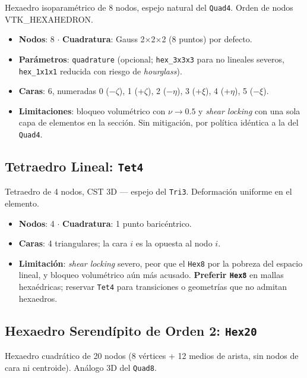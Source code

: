 \documentclass[11pt,oneside]{report}
\begin{document}
Hexaedro isoparamétrico de 8 nodos, espejo natural del \texttt{Quad4}. Orden de nodos VTK\_HEXAHEDRON.

\begin{itemize}
  \item \textbf{Nodos}: 8 \ensuremath{\cdot} \textbf{Cuadratura}: Gauss 2\ensuremath{\times}2\ensuremath{\times}2 (8 puntos) por defecto.
  \item \textbf{Parámetros}: \texttt{quadrature} (opcional; \texttt{hex\_3x3x3} para no lineales severos, \texttt{hex\_1x1x1} reducida con riesgo de \textit{hourglass}).
  \item \textbf{Caras}: 6, numeradas 0 (−\ensuremath{\zeta}), 1 (+\ensuremath{\zeta}), 2 (−\ensuremath{\eta}), 3 (+\ensuremath{\xi}), 4 (+\ensuremath{\eta}), 5 (−\ensuremath{\xi}).
  \item \textbf{Limitaciones}: bloqueo volumétrico con $\nu \to 0.5$ y \textit{shear locking} con una sola capa de elementos en la sección. Sin mitigación, por política idéntica a la del \texttt{Quad4}.
\end{itemize}

\subsection{Tetraedro Lineal: \texttt{Tet4}}

Tetraedro de 4 nodos, CST 3D --- espejo del \texttt{Tri3}. Deformación uniforme en el elemento.

\begin{itemize}
  \item \textbf{Nodos}: 4 \ensuremath{\cdot} \textbf{Cuadratura}: 1 punto baricéntrico.
  \item \textbf{Caras}: 4 triangulares; la cara $i$ es la opuesta al nodo $i$.
  \item \textbf{Limitación}: \textit{shear locking} severo, peor que el \texttt{Hex8} por la pobreza del espacio lineal, y bloqueo volumétrico aún más acusado. \textbf{Preferir \texttt{Hex8}} en mallas hexaédricas; reservar \texttt{Tet4} para transiciones o geometrías que no admitan hexaedros.
\end{itemize}

\subsection{Hexaedro Serendípito de Orden 2: \texttt{Hex20}}

Hexaedro cuadrático de 20 nodos (8 vértices + 12 medios de arista, sin nodos de cara ni centroide). Análogo 3D del \texttt{Quad8}.
\end{document}
